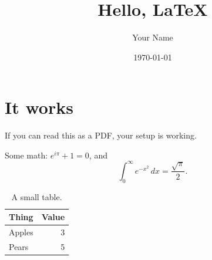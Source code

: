 \documentclass[11pt]{article}
\title{Hello, \LaTeX}
\author{Your Name}
\date{\today}
\begin{document}
\maketitle

\section{It works}
If you can read this as a PDF, your setup is working.

Some math: $e^{i\pi} + 1 = 0$, and
\begin{equation}
  \int_0^\infty e^{-x^2}\,dx = \frac{\sqrt{\pi}}{2}.
\end{equation}

\begin{table}[h]
  \centering
  \begin{tabular}{lr}
    \toprule
    Thing & Value \\
    \midrule
    Apples & 3 \\
    Pears  & 5 \\
    \bottomrule
  \end{tabular}
  \caption{A small table.}
\end{table}
\end{document}
